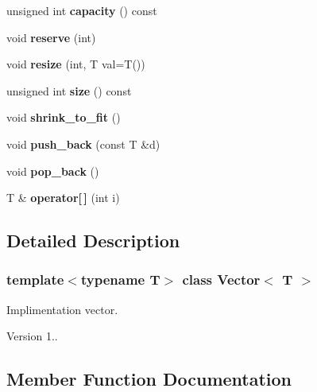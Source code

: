 \begin{DoxyCompactItemize}
\mbox{\label{classVector_a68ecb8dc5e1047cead715396d146ed61}} 
unsigned int {\bfseries capacity} () const
\item 
\mbox{\label{classVector_a059385ff13f47a93ce37905fd5d53f3a}} 
void {\bfseries reserve} (int)
\item 
\mbox{\label{classVector_a268b979b2dee0ae72b32759ab760fe18}} 
void {\bfseries resize} (int, T val=T())
\item 
\mbox{\label{classVector_a5214a382564aedc712b609416aa3b7b1}} 
unsigned int {\bfseries size} () const
\item 
\mbox{\label{classVector_ad6454ce193263b8000d4c18cb0c3a0c8}} 
void {\bfseries shrink\+\_\+to\+\_\+fit} ()
\item 
\mbox{\label{classVector_aed29bfc8028b4c6c18ebe89ed3f02119}} 
void {\bfseries push\+\_\+back} (const T \&d)
\item 
\mbox{\label{classVector_adcba035109febbe55cba2a25f8483ba6}} 
void {\bfseries pop\+\_\+back} ()
\item 
\mbox{\label{classVector_a5db0910fc60e17551b75f6b227c49b46}} 
T \& {\bfseries operator\mbox{[}$\,$\mbox{]}} (int i)
\end{DoxyCompactItemize}


\subsection{Detailed Description}
\subsubsection*{template$<$typename T$>$\newline
class Vector$<$ T $>$}

Implimentation vector. 

\begin{DoxyVersion}{Version}
1.. 
\end{DoxyVersion}


\subsection{Member Function Documentation}
\mbox{\label{classVector_ad688a8a0dfbd07ea63d838058a436f79}} 

